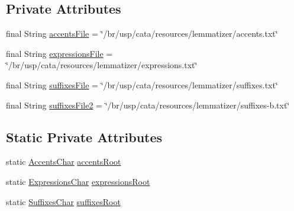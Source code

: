 \subsection*{Private Attributes}
\begin{DoxyCompactItemize}
\item 
final String \hyperlink{classbr_1_1usp_1_1cata_1_1component_1_1lemmatizer_1_1_lemmatizer_trees_ac447265bf3916189bd063ed9b9738cd3}{accents\+File} = \char`\"{}/br/usp/cata/resources/lemmatizer/accents.\+txt\char`\"{}
\item 
final String \hyperlink{classbr_1_1usp_1_1cata_1_1component_1_1lemmatizer_1_1_lemmatizer_trees_aca539fbee591a27d66cc1977a0175d15}{expressions\+File} = \char`\"{}/br/usp/cata/resources/lemmatizer/expressions.\+txt\char`\"{}
\item 
final String \hyperlink{classbr_1_1usp_1_1cata_1_1component_1_1lemmatizer_1_1_lemmatizer_trees_a04bbb41c672505518cb686410bcaa81e}{suffixes\+File} = \char`\"{}/br/usp/cata/resources/lemmatizer/suffixes.\+txt\char`\"{}
\item 
final String \hyperlink{classbr_1_1usp_1_1cata_1_1component_1_1lemmatizer_1_1_lemmatizer_trees_af4645525b8813e134fae84ed656b42cd}{suffixes\+File2} = \char`\"{}/br/usp/cata/resources/lemmatizer/suffixes-\/b.\+txt\char`\"{}
\end{DoxyCompactItemize}
\subsection*{Static Private Attributes}
\begin{DoxyCompactItemize}
\item 
static \hyperlink{classbr_1_1usp_1_1cata_1_1util_1_1lemmatizer_1_1_accents_char}{Accents\+Char} \hyperlink{classbr_1_1usp_1_1cata_1_1component_1_1lemmatizer_1_1_lemmatizer_trees_a3ff64828b81013c9f3ea1744e2ed996f}{accents\+Root}
\item 
static \hyperlink{classbr_1_1usp_1_1cata_1_1util_1_1lemmatizer_1_1_expressions_char}{Expressions\+Char} \hyperlink{classbr_1_1usp_1_1cata_1_1component_1_1lemmatizer_1_1_lemmatizer_trees_a72823e09db24036c2c8e241557a3f216}{expressions\+Root}
\item 
static \hyperlink{classbr_1_1usp_1_1cata_1_1util_1_1lemmatizer_1_1_suffixes_char}{Suffixes\+Char} \hyperlink{classbr_1_1usp_1_1cata_1_1component_1_1lemmatizer_1_1_lemmatizer_trees_a6e88697661cf7e6cfc419587f8e0cfd8}{suffixes\+Root}
\end{DoxyCompactItemize}


